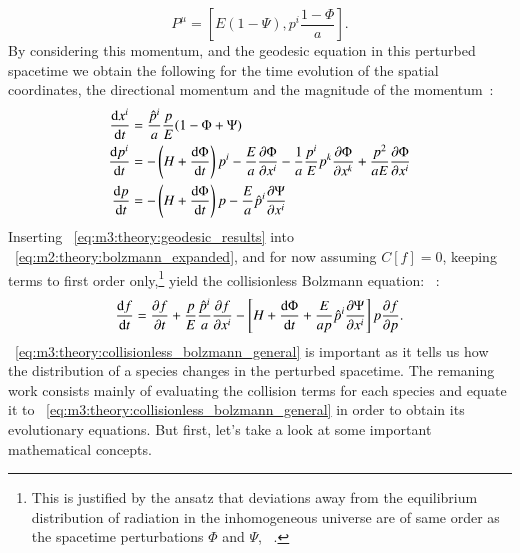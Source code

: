     \begin{equation}
        P^\mu = \left[E(1-\Psi), p^i\frac{1-\Phi}{a}\right].
    \end{equation}
    By considering this momentum, and the geodesic equation in this perturbed spacetime we obtain the following for the time evolution of the spatial coordinates, the directional momentum and the magnitude of the momentum~\cite[Eqs. 3.62, 3.69, 3.71]{dodelson2020modern}:
    \begin{subequations}\label{eq:m3:theory:geodesic_results}
        \begin{align}
            \dv{x^i}{t} &= \frac{\hat{p}^i}{a}\frac{p}{E}(1-\Phi+\Psi) \label{eq:m3:theory:metric_perturb_dxidt}\\
            \dv{p^i}{t} &= -\left(H+\dv{\Phi}{t}\right)p^i-\frac{E}{a}\pdv{\Phi}{x^i}-\frac{1}{a}\frac{p^i}{E}p^k\pdv{\Phi}{x^k} + \frac{p^2}{aE}\pdv{\Phi}{x^i} \label{eq:m3:theory:metric_perturb_dpidt}\\
            \dv{p}{t} &= -\left(H+\dv{\Phi}{t}\right)p-\frac{E}{a}\hat{p}^i\pdv{\Psi}{x^i} \label{eq:m3:theory:metric_perturb_dpdt}
        \end{align}
    \end{subequations}
    Inserting ~\cref{eq:m3:theory:geodesic_results} into ~\cref{eq:m2:theory:bolzmann_expanded}, and for now assuming $C[f]=0$, keeping terms to first order only,\footnote{This is justified by the ansatz that deviations away from the equilibrium distribution of radiation in the inhomogeneous universe are of same order as the spacetime perturbations $\Phi$ and $\Psi$, ~\cite{dodelson2020modern}.} yield the collisionless Bolzmann equation: ~\cite[Eq. 3.83]{dodelson2020modern}:
    \begin{equation}\label{eq:m3:theory:collisionless_bolzmann_general}
        \dv{f}{t} = \pdv{f}{t}+\frac{p}{E}\frac{\hat{p}^i}{a}\pdv{f}{x^i}-\left[H+\dv{\Phi}{t} + \frac{E}{ap}\hat{p}^i\pdv{\Psi}{x^i}\right]p\pdv{f}{p}.
    \end{equation}
    ~\cref{eq:m3:theory:collisionless_bolzmann_general} is important as it tells us how the distribution of a species changes in the perturbed spacetime. The remaning work consists mainly of evaluating the collision terms for each species and equate it to ~\cref{eq:m3:theory:collisionless_bolzmann_general} in order to obtain its evolutionary equations. But first, let's take a look at some important mathematical concepts. 

